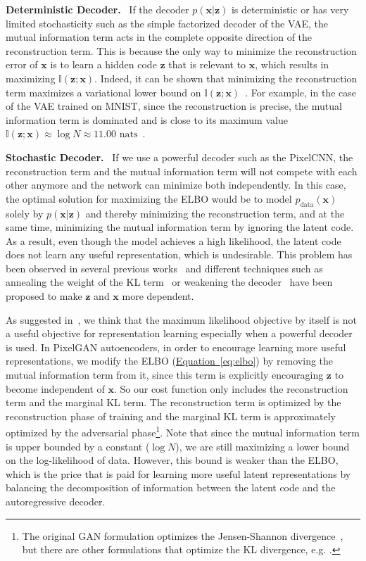 \documentclass{article}
\newcommand{\myeq}[1]{\hyperref[eq:#1]{Equation~\ref*{eq:#1}}}
\DeclareRobustCommand{\parhead}[1]{\textbf{#1}~}
\begin{document}
\parhead{Deterministic Decoder.} If the decoder $p(\mathbf{x}|\mathbf{z})$ is deterministic or has very limited stochasticity such as the simple factorized decoder of the VAE, the mutual information term acts in the complete opposite direction of the reconstruction term. This is because the only way to minimize the reconstruction error of $\mathbf{x}$ is to learn a hidden code $\mathbf{z}$ that is relevant to $\mathbf{x}$, which results in maximizing $\mathbb{I}(\mathbf{z};\mathbf{x})$. Indeed, it can be shown that minimizing the reconstruction term maximizes a variational lower bound on $\mathbb{I}(\mathbf{z};\mathbf{x})$~\citep{im,infogan}. For example, in the case of the VAE trained on MNIST, since the reconstruction is precise, the mutual information term is dominated and is close to its maximum value $\mathbb{I}(\mathbf{z};\mathbf{x}) \approx  \log N \approx 11.00 \text{ nats}$~\citep{surgery}. 

\parhead{Stochastic Decoder.} If we use a powerful decoder such as the PixelCNN, the reconstruction term and the mutual information term will not compete with each other anymore and the network can minimize both independently. In this case, the optimal solution for maximizing the ELBO would be to model $p_\text{data}(\mathbf{x})$ solely by $p(\mathbf{x}|\mathbf{z})$ and thereby minimizing the reconstruction term, and at the same time, minimizing the mutual information term by ignoring the latent code. As a result, even though the model achieves a high likelihood, the latent code does not learn any useful representation, which is undesirable. This problem has been observed in several previous works~\citep{bowman,vlae} and different techniques such as annealing the weight of the KL term~\citep{bowman} or weakening the decoder~\citep{vlae} have been proposed to make $\mathbf{z}$ and $\mathbf{x}$ more dependent. 



As suggested in~\citep{ference_ml,vlae}, we think that the maximum likelihood objective by itself is not a useful objective for representation learning especially when a powerful decoder is used. 
In PixelGAN autoencoders, in order to encourage learning more useful representations, we modify the ELBO (\myeq{elbo}) by removing the mutual information term from it, since this term is explicitly encouraging $\mathbf{z}$ to become independent of $\mathbf{x}$. So our cost function only includes the reconstruction term and the marginal KL term. The reconstruction term is optimized by the reconstruction phase of training and the marginal KL term is approximately optimized by the adversarial phase\footnote{The original GAN formulation optimizes the Jensen-Shannon divergence~\citep{gan}, but there are other formulations that optimize the KL divergence, e.g. \citep{ference}.}.
Note that since the mutual information term is upper bounded by a constant ($\log N$), we are still maximizing a lower bound on the log-likelihood of data. However, this bound is weaker than the ELBO, which is the price that is paid for learning more useful latent representations by balancing the decomposition of information between the latent code and the autoregressive decoder.
\end{document}
